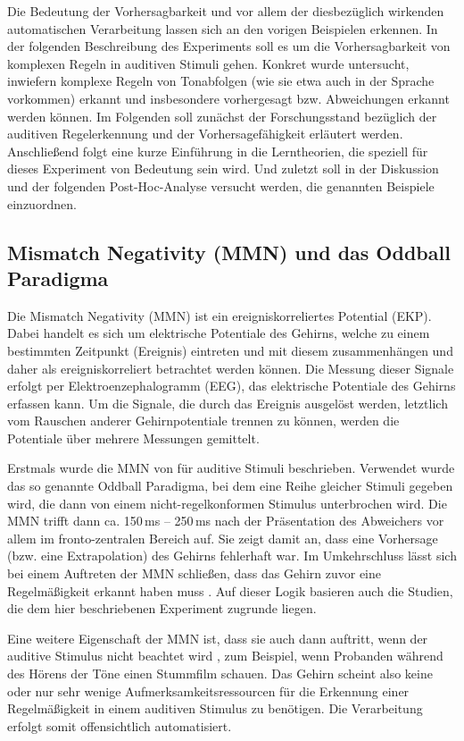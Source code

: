 \documentclass[doc,a4paper,12pt]{apa6}
\begin{document}
Die Bedeutung der Vorhersagbarkeit und vor allem der diesbezüglich wirkenden automatischen Verarbeitung lassen sich an den vorigen Beispielen erkennen. In der folgenden Beschreibung des Experiments soll es um die Vorhersagbarkeit von komplexen Regeln in auditiven Stimuli gehen. Konkret wurde untersucht, inwiefern komplexe Regeln von Tonabfolgen (wie sie etwa auch in der Sprache vorkommen) erkannt und insbesondere vorhergesagt bzw. Abweichungen erkannt werden können. Im Folgenden soll zunächst der Forschungsstand bezüglich der auditiven Regelerkennung und der Vorhersagefähigkeit erläutert werden. Anschließend folgt eine kurze Einführung in die Lerntheorien, die speziell für dieses Experiment von Bedeutung sein wird. Und zuletzt soll in der Diskussion und der folgenden Post-Hoc-Analyse versucht werden, die genannten Beispiele einzuordnen.

\subsection{Mismatch Negativity (MMN) und das Oddball Paradigma}

Die Mismatch Negativity (MMN) ist ein ereigniskorreliertes Potential (EKP). Dabei handelt es sich um elektrische Potentiale des Gehirns, welche zu einem bestimmten Zeitpunkt (Ereignis) eintreten und mit diesem zusammenhängen und daher als ereigniskorreliert betrachtet werden können. Die Messung dieser Signale erfolgt per Elektroenzephalogramm (EEG), das elektrische Potentiale des Gehirns erfassen kann. Um die Signale, die durch das Ereignis ausgelöst werden, letztlich vom Rauschen anderer Gehirnpotentiale trennen zu können, werden die Potentiale über mehrere Messungen gemittelt.

Erstmals wurde die MMN von \textcite{naatanen1978early} für auditive Stimuli beschrieben. Verwendet wurde das so genannte Oddball Paradigma, bei dem eine Reihe gleicher Stimuli gegeben wird, die dann von einem nicht-regelkonformen Stimulus unterbrochen wird. Die MMN trifft dann ca. 150\,ms – 250\,ms nach der Präsentation des Abweichers vor allem im fronto-zentralen Bereich auf. Sie zeigt damit an, dass eine Vorhersage (bzw. eine Extrapolation) des Gehirns fehlerhaft war. Im Umkehrschluss lässt sich bei einem Auftreten der MMN schließen, dass das Gehirn zuvor eine Regelmäßigkeit erkannt haben muss \parencite{schroger2007mismatch}. Auf dieser Logik basieren auch die Studien, die dem hier beschriebenen Experiment zugrunde liegen.

Eine weitere Eigenschaft der MMN ist, dass sie auch dann auftritt, wenn der auditive Stimulus nicht beachtet wird \parencite{naatanen2007mismatch}, zum Beispiel, wenn Probanden während des Hörens der Töne einen Stummfilm schauen. Das Gehirn scheint also keine oder nur sehr wenige Aufmerksamkeitsressourcen für die Erkennung einer Regelmäßigkeit in einem auditiven Stimulus zu benötigen. Die Verarbeitung erfolgt somit offensichtlich automatisiert.
\end{document}
